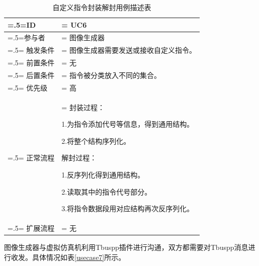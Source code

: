 \begin{table}[htbp]
    \begin{center}
        \caption{自定义指令封装解封用例描述表}
        \label{usecase6}
        \renewcommand\arraystretch{1.5}
        \begin{tabularx}{0.8\textwidth}{ 
            | >{\centering\arraybackslash\hsize=.5\hsize\linewidth=\hsize}X 
            | >{\raggedright\arraybackslash\hsize=1.5\hsize\linewidth=\hsize}X 
            | }
            \hline
            \textbf{ID} & \textbf{UC6}\\
            \hline
            参与者 & 图像生成器\\
            \hline
            触发条件 & 图像生成器需要发送或接收自定义指令。\\
            \hline
            前置条件 & 无\\
            \hline
            后置条件 & 指令被分类放入不同的集合。\\
            \hline
            优先级 & 高\\
            \hline
            正常流程 & 封装过程：\par 1.为指令添加代号等信息，得到通用结构。\par 2.将整个结构序列化。\par 
                      解封过程：\par 1.反序列化得到通用结构。\par 2.读取其中的指令代号部分。\par 3.将指令数据段用对应结构再次反序列化。\\
            \hline
            扩展流程 & 无\\
            \hline
        \end{tabularx}
    \end{center}
\end{table}
\par
图像生成器与虚拟仿真机利用Tbuspp插件进行沟通，双方都需要对Tbuspp消息进行收发。具体情况如表\ref{usecase7}所示。
